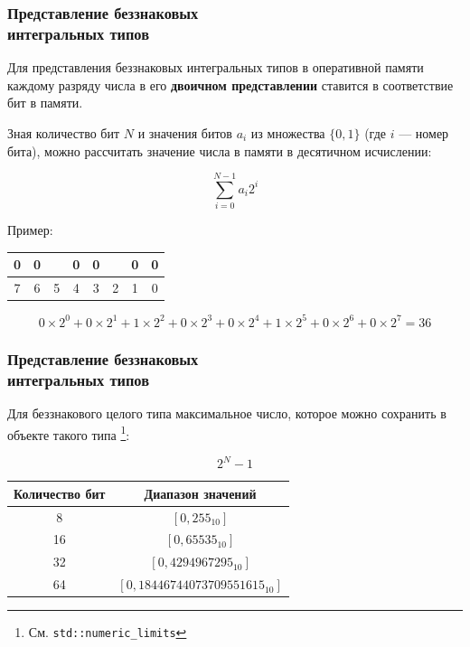 \documentclass[compress, 8pt, aspectratio=169]{beamer}
\newenvironment{eightbit}{%
    \begin{center}
        \begin{tabular}{ |m{0.2cm}|m{0.2cm}|m{0.2cm}|m{0.2cm}|m{0.2cm}|m{0.2cm}|m{0.2cm}|m{0.2cm}|  }
            \hline
}{
        \hline
        \multicolumn{1}{c}{\color{gray}\tiny{7}} &
        \multicolumn{1}{c}{\color{gray}\tiny{6}} &
        \multicolumn{1}{c}{\color{gray}\tiny{5}} &
        \multicolumn{1}{c}{\color{gray}\tiny{4}} &
        \multicolumn{1}{c}{\color{gray}\tiny{3}} &
        \multicolumn{1}{c}{\color{gray}\tiny{2}} &
        \multicolumn{1}{c}{\color{gray}\tiny{1}} &
        \multicolumn{1}{c}{\color{gray}\tiny{0}} \\
        \end{tabular}
    \end{center}
}
\begin{document}
\begin{frame}[fragile]

    \frametitle{Представление беззнаковых \\ интегральных типов}

    Для представления беззнаковых интегральных типов в оперативной
    памяти каждому разряду числа в его \textbf{двоичном представлении}
    ставится в соответствие бит в памяти.

    \hfill \break
    Зная количество бит \(N\) и значения битов \(a_i\) из множества
    \(\{0,1\}\) (где \(i\) --- номер бита), можно рассчитать значение
    числа в памяти в десятичном исчислении:

    \begin{displaymath}
\sum_{i=0}^{N-1}{a_i 2^i}
    \end{displaymath}

    Пример:

    \begin{eightbit}
        0 & 0 & \cellcolor{gray}{1} & 0 & 0 & \cellcolor{gray}{1} & 0 & 0 \\
    \end{eightbit}

    \begin{displaymath}
0 \times 2^0 + 0 \times 2^1 + 1 \times 2^2 + 0 \times 2^3 + 0 \times 2^4
        + 1 \times 2^5 + 0 \times 2^6 + 0 \times 2^7 = 36
    \end{displaymath}

\end{frame}

\begin{frame}[fragile]

    \frametitle{Представление беззнаковых \\ интегральных типов}

    Для беззнакового целого типа максимальное число, которое можно
    сохранить в объекте такого типа
    \footnote{См. \texttt{std::numeric\_limits}}:

    \begin{displaymath}
2^N-1
    \end{displaymath}

    \hfill \break

    \begin{center}
        \begin{tabular}{|c|c|}
            \hline
            Количество бит & Диапазон значений \\
            \hline
            \hline
            8 & \([0,255_{10}]\) \\
            16 & \([0,65535_{10}]\) \\
            32 & \([0,4294967295_{10}]\) \\
            64 & \([0,18446744073709551615_{10}]\) \\
            \hline
        \end{tabular}
    \end{center}

\end{frame}
\end{document}
